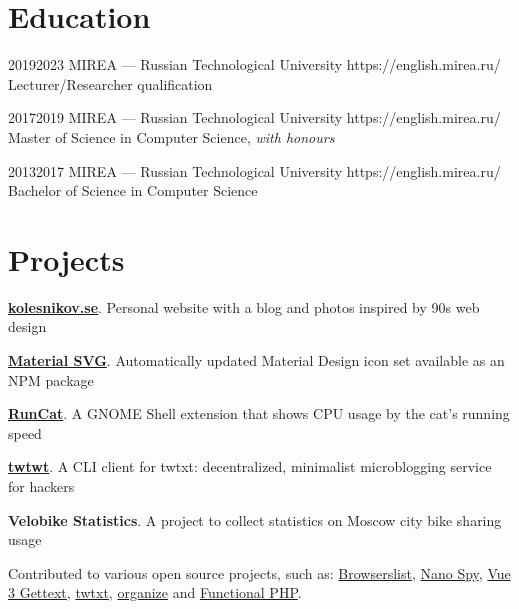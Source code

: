 \documentclass[10pt]{article}
\begin{document}

\section{Education}

\education
	{2019}{2023}
	{MIREA --- Russian Technological University}
	{https://english.mirea.ru/}
	{}
	{Lecturer/Researcher qualification}

\education
	{2017}{2019}
	{MIREA --- Russian Technological University}
	{https://english.mirea.ru/}
	{}
	{Master of Science in Computer Science, \textit{with honours}}

\education
	{2013}{2017}
	{MIREA --- Russian Technological University}
	{https://english.mirea.ru/}
	{}
	{Bachelor of Science in Computer Science}


\section{Projects}

\begin{compactitemize}
	\item \textbf{\href{https://kolesnikov.se/}{kolesnikov.se}}. Personal website with a blog and photos inspired by 90s web design
	\item \textbf{\href{https://github.com/cloudblue/material-svg}{Material SVG}}. Automatically updated Material Design icon set available as an NPM package
	\item \textbf{\href{https://github.com/win0err/gnome-runcat}{RunCat}}. A GNOME Shell extension that shows CPU usage by the cat's running speed
	\item \textbf{\href{https://github.com/win0err/twtwt}{twtwt}}. A CLI client for twtxt: decentralized, minimalist microblogging service for hackers
	\item \textbf{Velobike Statistics}. A project to collect statistics on Moscow city bike sharing usage
\end{compactitemize}

Contributed to various open source projects, such as:
\href{https://github.com/browserslist/browserslist/pulls?q=author:win0err}{Browserslist},
\href{https://github.com/ai/nanospy/pulls?q=author:win0err}{Nano Spy},
\href{https://github.com/jshmrtn/vue3-gettext/pulls?q=author:win0err}{Vue 3 Gettext},
\href{https://github.com/buckket/twtxt/pulls?q=author:win0err}{twtxt},
\href{https://github.com/tfeldmann/organize/pulls?q=author:win0err}{organize} and \href{https://github.com/lstrojny/functional-php/pulls?q=author:win0err}{Functional PHP}.
\end{document}
